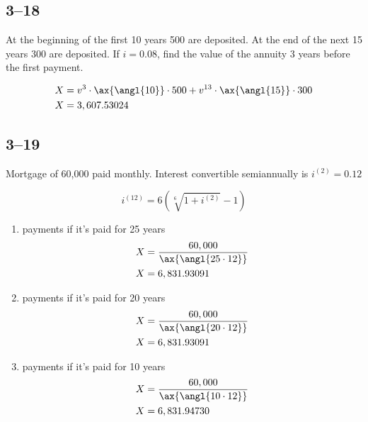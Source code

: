 \documentclass[a4paper, 12pt, reqno]{amsart}
\numberwithin{equation}{section}
\begin{document}
\subsection*{3--18}

At the beginning of the first 10 years 500 are deposited. At the end of the
next 15 years 300 are deposited. If $i=0.08$, find the value of the annuity
3 years before the first payment.

\begin{equation}\nonumber
    \begin{aligned}
        X &= v^3 \cdot \ax{\angl{10}} \cdot 500 + v^{13} \cdot \ax{\angl{15}}
            \cdot 300               \\
        X &= 3,607.53024
    \end{aligned}
\end{equation}

\subsection*{3--19}

Mortgage of 60,000 paid monthly. Interest convertible semiannually is $i^{(2)}
= 0.12$

\begin{equation}\nonumber
    i^{(12)} = 6(\sqrt[6]{1 + i^{(2)}} - 1)
\end{equation}

\begin{enumerate}[label=(\alph*)]
    \item payments if it's paid for 25 years
        \begin{equation}\nonumber
            \begin{aligned}
                X &= \frac{60,000}{\ax{\angl{25\cdot12}}}   \\
                X &= 6,831.93091
            \end{aligned}
        \end{equation}
    \item payments if it's paid for 20 years
        \begin{equation}\nonumber
            \begin{aligned}
                X &= \frac{60,000}{\ax{\angl{20\cdot12}}}   \\
                X &= 6,831.93091
            \end{aligned}
        \end{equation}
    \item payments if it's paid for 10 years
        \begin{equation}\nonumber
            \begin{aligned}
                X &= \frac{60,000}{\ax{\angl{10\cdot12}}}   \\
                X &= 6,831.94730
            \end{aligned}
        \end{equation}
\end{enumerate}
\end{document}
